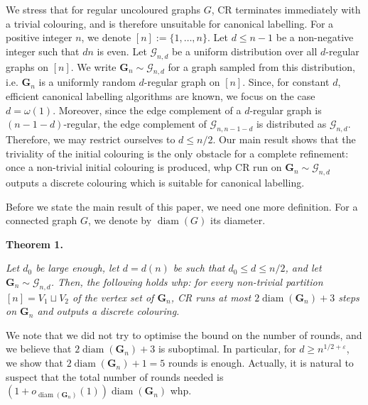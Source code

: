 We stress that for regular uncoloured graphs $G$, CR terminates immediately with a trivial colouring, and is therefore unsuitable for canonical labelling. For a positive integer $n$, we denote $[n]:=\{1,\ldots,n\}$. Let $d\leq n-1$ be a non-negative integer such that $dn$ is even. Let $\mathcal{G}_{n,d}$ be a uniform distribution over all $d$-regular graphs on $[n]$. We write $\mathbf{G}_{n}\sim\mathcal{G}_{n,d}$ for a graph sampled from this distribution, i.e. $\mathbf{G}_{n}$ is a uniformly random $d$-regular graph on $[n]$. Since, for constant $d$, efficient canonical labelling algorithms are known, we focus on the case $d=\omega(1)$. Moreover, since the edge complement of a $d$-regular graph is $(n-1-d)$-regular, the edge complement of $\mathcal{G}_{n,n-1-d}$ is distributed as $\mathcal{G}_{n,d}$. Therefore, we may restrict ourselves to $d\leq n/2$. Our main result shows that the triviality of the initial colouring is the only obstacle for a complete refinement: once a non-trivial initial colouring is produced, whp CR run on $\mathbf{G}_{n}\sim\mathcal{G}_{n,d}$ outputs a discrete colouring which is suitable for canonical labelling.\par




Before we state the main result of this paper, we need one more definition. For a connected graph $G$, we denote by $\operatorname{diam}(G)$ its diameter.\par





\par\medskip\noindent\textbf{
\textbf{Theorem 1}\textbf{.}
}\par



\emph{Let $d_{0}$ be large enough, let $d=d(n)$ be such that $d_{0}\leq d\leq n/2$, and let $\mathbf{G}_{n}\sim\mathcal{G}_{n,d}$. Then, the following holds whp:
for every non-trivial partition $[n]=V_{1}\sqcup V_{2}$ of the vertex set of $\mathbf{G}_{n}$, CR runs at most $2\operatorname{diam}(\mathbf{G}_{n})+3$ steps on $\mathbf{G}_{n}$ and outputs a discrete colouring.}\par






We note that we did not try to optimise the bound on the number of rounds, and we believe that $2\operatorname{diam}(\mathbf{G}_{n})+3$ is suboptimal. In particular, for $d\geq n^{1/2+\varepsilon}$, we show that $2\operatorname{diam}(\mathbf{G}_{n})+1=5$ rounds is enough. Actually, it is natural to suspect that the total number of rounds needed is $(1+o_{\operatorname{diam}(\mathbf{G}_{n})}(1))\operatorname{diam}(\mathbf{G}_{n})$ whp.\par




